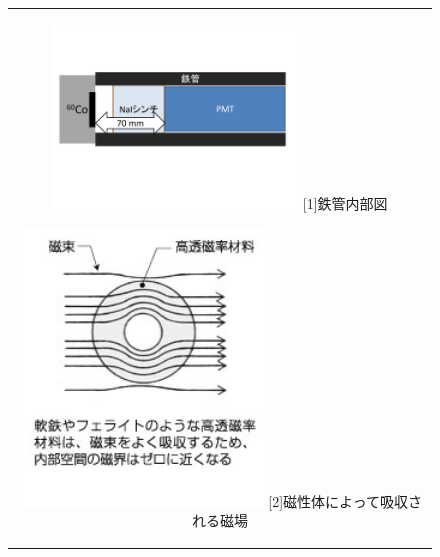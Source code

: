\begin{figure}[t]
  \begin{center}
    \begin{tabular}{c}
      \begin{minipage}[h]{0.5\hsize}    
        \begin{center}
          \includegraphics[width=6.5cm]{fig/iguchi/PMTinFe.pdf}
	\hspace{3cm}[1]鉄管内部図
     \end{center}
    \end{minipage}
      \begin{minipage}[h]{0.5\hsize}    
        \begin{center}
          \includegraphics[width=6.5cm]{fig/iguchi/jibakyusyu.jpg}
         \hspace{3cm}[2]磁性体によって吸収される磁場
         \end{center}
        \end{minipage}
     
     \end{tabular}
    \end{center}
   \end{figure}
   

